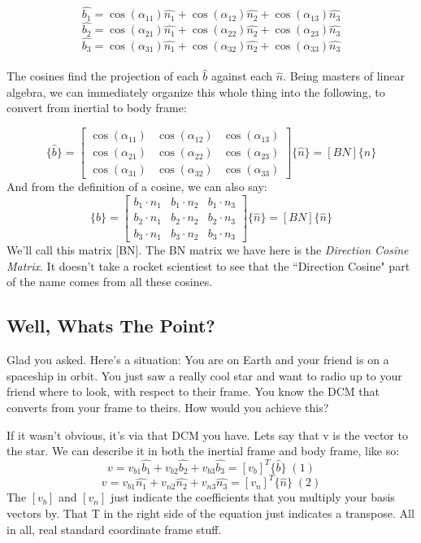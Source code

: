 \documentclass[a4paper,14pt]{extreport}
\newcommand{\bv}[1]{\hat{b_{#1}}}
\newcommand{\nv}[1]{\hat{n_{#1}}}
\begin{document}
\[\bv{1} = \cos(\alpha_{11})\nv{1} + \cos(\alpha_{12})\nv{2} + \cos(\alpha_{13})\nv{3}\]
\[\bv{2} = \cos(\alpha_{21})\nv{1} + \cos(\alpha_{22})\nv{2} + \cos(\alpha_{23})\nv{3}\]
\[\bv{3} = \cos(\alpha_{31})\nv{1} + \cos(\alpha_{32})\nv{2} + \cos(\alpha_{33})\nv{3}\]
\\
The cosines find the projection of each $\hat{b}$ against each $\hat{n}$. Being masters of linear algebra, we can immediately organize this whole thing into the following, to convert from inertial to body frame:

\[
\{\hat{b}\} = \begin{bmatrix}
\cos(\alpha_{11})&\cos(\alpha_{12})&\cos(\alpha_{13}) \\
\cos(\alpha_{21})&\cos(\alpha_{22})&\cos(\alpha_{23}) \\
\cos(\alpha_{31})&\cos(\alpha_{32})&\cos(\alpha_{33})
\end{bmatrix} \{\hat{n}\} = [BN] \{\hat{n}\}
\]
And from the definition of a cosine, we can also say:
\[
\{\hat{b}\} = \begin{bmatrix}
b_1 \cdot n_1 & b_1 \cdot n_2 & b_1 \cdot n_3 \\
b_2 \cdot n_1 & b_2 \cdot n_2 & b_2 \cdot n_3 \\
b_3 \cdot n_1 & b_3 \cdot n_2 & b_3 \cdot n_3
\end{bmatrix} \{\hat{n}\} = [BN] \{\hat{n}\}
\]
We'll call this matrix [BN]. The BN matrix we have here is the \emph{Direction Cosine Matrix}. It doesn't take a rocket scientiest to see that the ``Direction Cosine" part of the name comes from all these cosines.
\subsection{Well, Whats The Point?}
Glad you asked. Here's a situation: You are on Earth and your friend is on a spaceship in orbit. You just saw a really cool star and want to radio up to your friend where to look, with respect to their frame. You know the DCM that converts from your frame to theirs. How would you achieve this?

If it wasn't obvious, it's via that DCM you have. Lets say that v is the vector to the star. We can describe it in both the inertial frame and body frame, like so:
\[v = v_{b1}\bv{1}+v_{b2}\bv{2}+v_{b3}\bv{3}=[v_b]^T\{\hat{b}\}\;(1)\]
\[v = v_{b1}\nv{1}+v_{n2}\nv{2}+v_{n3}\nv{3}=[v_n]^T\{\hat{n}\}\;(2)\]
The $[v_b]$ and $[v_n]$ just indicate the coefficients that you multiply your basis vectors by. That T in the right side of the equation just indicates a transpose. All in all, real standard coordinate frame stuff. 
\end{document}
